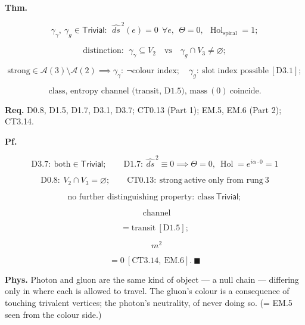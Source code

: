 \begin{theorem}\label{tag:CT3-12}
\textbf{Thm.}

\[
\gamma_\gamma,\ \gamma_g\in\mathsf{Trivial}:\ \ \widehat{ds}^{\,2}(e)=0\ \ \forall e,\ \ \Theta=0,\ \ \operatorname{Hol}_{\mathrm{spiral}}=1;
\]

\[
\text{distinction}:\ \ \gamma_\gamma\subseteq V_2\quad\text{vs}\quad\gamma_g\cap V_3\ne\varnothing;
\]

\[
\mathrm{strong}\in\mathcal A(3)\setminus\mathcal A(2)\implies\gamma_\gamma:\ \neg\text{colour index};\quad\gamma_g:\ \text{slot index possible}\ [\mathrm{D3.1}];
\]

\[
\text{class, entropy channel (transit, D1.5), mass}\ (0)\ \text{coincide}.
\]

\textbf{Req.} D0.8, D1.5, D1.7, D3.1, D3.7; CT0.13 (Part 1); EM.5, EM.6 (Part 2); CT3.14.

\textbf{Pf.}

\[
\mathrm{D3.7}:\ \text{both}\in\mathsf{Trivial};\qquad\mathrm{D1.7}:\ \widehat{ds}^{\,2}\equiv0\implies\Theta=0,\ \operatorname{Hol}=e^{i\alpha\cdot0}=1
\]

\[
\mathrm{D0.8}:\ V_2\cap V_3=\varnothing;\qquad\mathrm{CT0.13}:\ \mathrm{strong}\ \text{active only from rung}\ 3
\]

\[
\text{no further distinguishing property}:\ \text{class}\ \mathsf{Trivial};
\]

\[
\ \ \text{channel}
\]

\[
= \text{transit}\ [\mathrm{D1.5}];
\]

\[
\ \ m^2
\]

\[
= 0\ [\mathrm{CT3.14},\ \mathrm{EM.6}].\ \blacksquare
\]

\textbf{Phys.} Photon and gluon are the same kind of object — a null chain — differing only in where each is allowed to travel. The gluon’s colour is a consequence of touching trivalent vertices; the photon’s neutrality, of never doing so. (= EM.5 seen from the colour side.)

\end{theorem}

